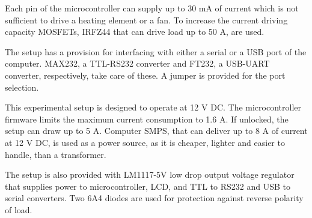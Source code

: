 
Each pin of the microcontroller can supply up to 30 mA of current
which is not sufficient to drive a heating element or a fan. To
increase the current driving capacity MOSFETs, IRFZ44
that can drive load up to 50 A, are used.

The setup has a provision for interfacing with either a serial or a
USB port of the computer. MAX232, a TTL-RS232 converter and FT232, a
USB-UART converter, respectively, take care of these. A jumper is
provided for the port selection.

This experimental setup is designed to operate at 12 V DC. The
microcontroller firmware limits the maximum current consumption to 1.6
A. If unlocked, the setup can draw up to 5 A. Computer SMPS, that can
deliver up to 8 A of current at 12 V DC, is used as a power
source, as it is cheaper, lighter and easier to handle, than a
transformer.

The setup is also provided with LM1117-5V low drop output voltage
regulator that supplies power to microcontroller, LCD, and TTL to
RS232 and USB to serial converters. Two 6A4 diodes are used for
protection against reverse polarity of load.


